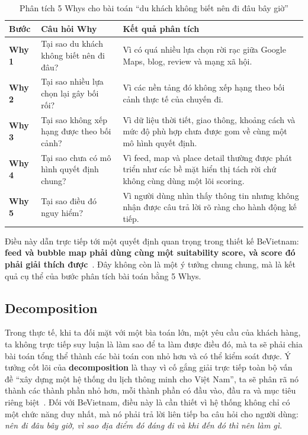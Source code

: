 \begin{table}[H]
\centering
\caption{Phân tích 5 Whys cho bài toán ``du khách không biết nên đi đâu bây giờ''}
\begin{tabularx}{\textwidth}{>{\raggedright\arraybackslash}p{1.8cm} X X}
\toprule
\textbf{Bước} & \textbf{Câu hỏi Why} & \textbf{Kết quả phân tích} \\
\midrule
\textbf{Why 1} & Tại sao du khách không biết nên đi đâu? & Vì có quá nhiều lựa chọn rời rạc giữa Google Maps, blog, review và mạng xã hội. \\
\textbf{Why 2} & Tại sao nhiều lựa chọn lại gây bối rối? & Vì các nền tảng đó không xếp hạng theo bối cảnh thực tế của chuyến đi. \\
\textbf{Why 3} & Tại sao không xếp hạng được theo bối cảnh? & Vì dữ liệu thời tiết, giao thông, khoảng cách và mức độ phù hợp chưa được gom về cùng một mô hình quyết định. \\
\textbf{Why 4} & Tại sao chưa có mô hình quyết định chung? & Vì feed, map và place detail thường được phát triển như các bề mặt hiển thị tách rời chứ không cùng dùng một lõi scoring. \\
\textbf{Why 5} & Tại sao điều đó nguy hiểm? & Vì người dùng nhìn thấy thông tin nhưng không nhận được câu trả lời rõ ràng cho hành động kế tiếp. \\
\bottomrule
\end{tabularx}
\end{table}

Điều này dẫn trực tiếp tới một quyết định quan trọng trong thiết kế
BeVietnam: \textbf{feed và bubble map phải dùng cùng một suitability
score, và score đó phải giải thích được}~\cite{bevietnam_spec}. Đây
không còn là một ý tưởng chung chung, mà là kết quả cụ thể của bước
phân tích bài toán bằng 5 Whys.

\subsection{Decomposition}
\contrib

Trong thực tế, khi ta đối mặt với một bìa toán lớn, một yêu cầu của khách hàng, ta không trực tiếp suy luận
là làm sao để ta làm được điều đó, mà ta sẽ phải chia bài
toán tổng thể thành các bài toán con nhỏ hơn và có thể kiểm soát được. Ý tưởng cốt
lõi của \textbf{decomposition} là thay vì cố gắng giải trực tiếp toàn bộ
vấn đề ``xây dựng một hệ thống du lịch thông minh cho Việt Nam'', ta sẽ
phân rã nó thành các thành phần nhỏ hơn, mỗi thành phần có đầu vào, đầu
ra và mục tiêu riêng biệt~\cite{spronck2023, openstax_ct}. Đối với BeVietnam, điều
này là cần thiết vì hệ thống không chỉ có một chức năng duy
nhất, mà nó phải trả lời liên tiếp ba câu hỏi cho người dùng: \textit{nên
đi đâu bây giờ, vì sao địa điểm đó đáng đi và khi đến đó thì nên làm gì}.


